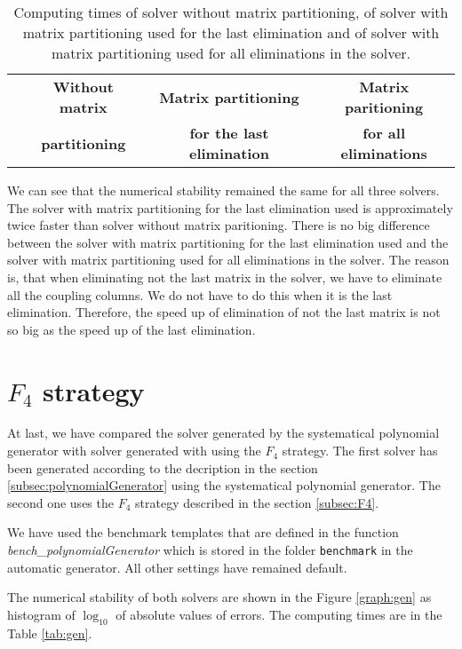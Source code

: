 \begin{table}[ht]
  \centering
  \begin{tabular}{|c||ccc|}
    \hline
      & \textbf{Without matrix} & \textbf{Matrix partitioning}      & \textbf{Matrix paritioning} \\
      & \textbf{partitioning}   & \textbf{for the last elimination} & \textbf{for all eliminations} \\
    \hline\hline
    
    \hline
  \end{tabular}
  \caption{Computing times of solver without matrix partitioning, of solver with matrix partitioning used for the last elimination and of solver with matrix partitioning used for all eliminations in the solver.}
  \label{tab:part}
\end{table}

We can see that the numerical stability remained the same for all three solvers. The solver with matrix partitioning for the last elimination used is approximately twice faster than solver without matrix paritioning. There is no big difference between the solver with matrix partitioning for the last elimination used and the solver with matrix partitioning used for all eliminations in the solver. The reason is, that when eliminating not the last matrix in the solver, we have to eliminate all the coupling columns. We do not have to do this when it is the last elimination. Therefore, the speed up of elimination of not the last matrix is not so big as the speed up of the last elimination.

\section{$F_4$ strategy}
\label{exp:gen}
At last, we have compared the solver generated by the systematical polynomial generator with solver generated with using the $F_4$ strategy. The first solver has been generated according to the decription in the section \ref{subsec:polynomialGenerator} using the systematical polynomial generator. The second one uses the $F_4$ strategy described in the section \ref{subsec:F4}.

We have used the benchmark templates that are defined in the function \textit{bench\_poly\-nomialGenerator} which is stored in the folder \texttt{benchmark} in the automatic generator. All other settings have remained default.

The numerical stability of both solvers are shown in the Figure \ref{graph:gen} as histogram of $\log_{10}$ of absolute values of errors. The computing times are in the Table \ref{tab:gen}.

